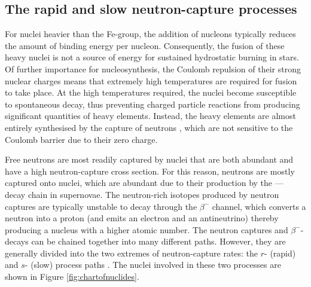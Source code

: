 \subsection{The rapid and slow neutron-capture processes}
For nuclei heavier than the Fe-group, the addition of nucleons typically reduces the amount of binding energy per nucleon. Consequently, the fusion of these heavy nuclei is not a source of energy for sustained hydrostatic burning in stars. Of further importance for nucleosynthesis, the Coulomb repulsion of their strong nuclear charges means that extremely high temperatures are required for fusion to take place. At the high temperatures required, the nuclei become susceptible to spontaneous decay, thus preventing charged particle reactions from producing significant quantities of heavy elements. Instead, the heavy elements are almost entirely synthesised by the capture of neutrons \citep[aside from a small number of proton-rich nuclides,][]{Arnould:2003gi}, which are not sensitive to the Coulomb barrier due to their zero charge.

Free neutrons are most readily captured by nuclei that are both abundant and have a high neutron-capture cross section. For this reason, neutrons are mostly captured onto  nuclei, which are abundant due to their production by the ---- decay chain in supernovae. The neutron-rich isotopes produced by neutron captures are typically unstable to decay through the $\beta^-$ channel, which converts a neutron into a proton (and emits an electron and an antineutrino) thereby producing a nucleus with a higher atomic number. The neutron captures and $\beta^-$-decays can be chained together into many different paths. However, they are generally divided into the two extremes of neutron-capture rates: the $r$- (rapid) and $s$- (slow) process paths \citep{Burbidge:1957hf,Cameron:1957jd,Cameron:1957jm}. The nuclei involved in these two processes are shown in Figure \ref{fig:chartofnuclides}.

